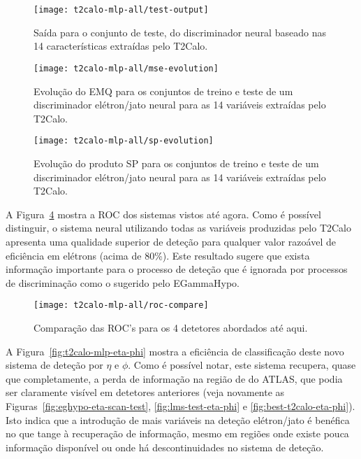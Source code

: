 \begin{figure}
\begin{center}
\texttt{[image: t2calo-mlp-all/test-output]}
\end{center}
\caption{Saída para o conjunto de teste, do discriminador neural baseado nas
14 características extraídas pelo T2Calo.}
\label{fig:t2calo-mlp-all-output}
\end{figure}

\begin{figure}
\begin{center}
\texttt{[image: t2calo-mlp-all/mse-evolution]}
\end{center}
\caption{Evolução do EMQ para os conjuntos de treino e teste de um
discriminador elétron/jato neural para as 14 variáveis extraídas pelo T2Calo.}
\label{fig:t2calo-mlp-all-mse-evo}
\end{figure}

\begin{figure}
\begin{center}
\texttt{[image: t2calo-mlp-all/sp-evolution]}
\end{center}
\caption{Evolução do produto SP para os conjuntos de treino e teste de um
discriminador elétron/jato neural para as 14 variáveis extraídas pelo T2Calo.}
\label{fig:t2calo-mlp-all-sp-evo}
\end{figure}

A Figura~\ref{fig:t2calo-mlp-all-roc-comp} mostra a ROC dos sistemas vistos
até agora. Como é possível distinguir, o sistema neural utilizando todas as
variáveis produzidas pelo T2Calo apresenta uma qualidade superior de deteção
para qualquer valor razoável de eficiência em elétrons (acima de 80\%). Este
resultado sugere que exista informação importante para o processo de deteção
que é ignorada por processos de discriminação como o sugerido pelo
EGammaHypo.  

\begin{figure}
\begin{center}
\texttt{[image: t2calo-mlp-all/roc-compare]}
\end{center}
\caption{Comparação das ROC's para os 4 detetores abordados até aqui.}
\label{fig:t2calo-mlp-all-roc-comp}
\end{figure}

A Figura~\ref{fig:t2calo-mlp-eta-phi} mostra a eficiência de classificação
deste novo sistema de deteção por $\eta$ e $\phi$. Como é possível notar, este
sistema recupera, quase que completamente, a perda de informação na região de
 do ATLAS, que podia ser claramente visível em detetores
anteriores (veja novamente as Figuras~\ref{fig:eghypo-eta-scan-test},
\ref{fig:lms-test-eta-phi} e \ref{fig:best-t2calo-eta-phi}). Isto indica que
a introdução de mais variáveis na deteção elétron/jato é benéfica no que
tange à recuperação de informação, mesmo em regiões onde existe pouca
informação disponível ou onde há descontinuidades no sistema de deteção.

